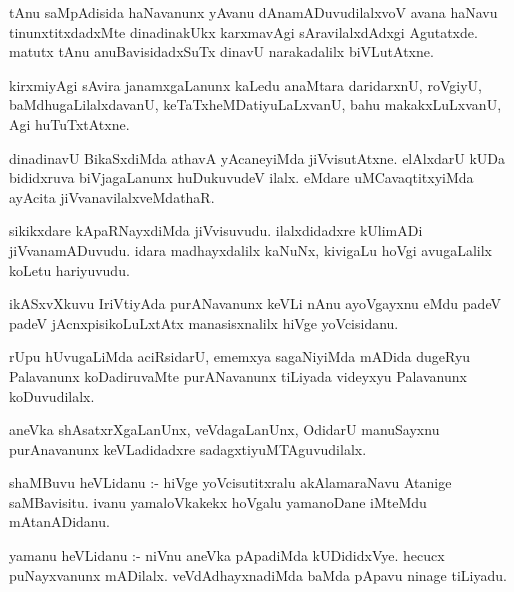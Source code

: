 \documentclass{article}
\begin{document}
\begin{mn}
tAnu  saMpAdisida  haNavanunx  yAvanu  dAnamADuvudilalxvoV  avana  haNavu  tinunxtitxdadxMte  dinadinakUkx  
karxmavAgi  sAravilalxdAdxgi  Agutatxde.  matutx  tAnu  anuBavisidadxSuTx  dinavU  narakadalilx  biVLutAtxne.
\end{mn}

\begin{mn}
kirxmiyAgi  sAvira  janamxgaLanunx  kaLedu  anaMtara  daridarxnU,  roVgiyU,  baMdhugaLilalxdavanU,  
keTaTxheMDatiyuLaLxvanU,  bahu  makakxLuLxvanU,  Agi  huTuTxtAtxne.
\end{mn}

\begin{mn}
dinadinavU  BikaSxdiMda  athavA  yAcaneyiMda  jiVvisutAtxne.  elAlxdarU  kUDa  bididxruva  
biVjagaLanunx  huDukuvudeV  ilalx.  eMdare  uMCavaqtitxyiMda  ayAcita jiVvanavilalxveMdathaR.
\end{mn}

\begin{mn}
sikikxdare  kApaRNayxdiMda  jiVvisuvudu.  ilalxdidadxre  kUlimADi  jiVvanamADuvudu.  idara  
madhayxdalilx  kaNuNx,  kivigaLu  hoVgi  avugaLalilx  koLetu  hariyuvudu.
\end{mn}

\begin{mn}
ikASxvXkuvu  IriVtiyAda  purANavanunx  keVLi  nAnu  ayoVgayxnu  eMdu  padeV padeV  jAcnxpisikoLuLxtAtx  
manasisxnalilx  hiVge  yoVcisidanu.
\end{mn}

\begin{mn}
rUpu  hUvugaLiMda  aciRsidarU,  ememxya  sagaNiyiMda  mADida  dugeRyu  Palavanunx  koDadiruvaMte  
purANavanunx  tiLiyada  videyxyu  Palavanunx  koDuvudilalx.
\end{mn}

\begin{mn}
aneVka  shAsatxrXgaLanUnx,  veVdagaLanUnx,  OdidarU  manuSayxnu  purAnavanunx  keVLadidadxre  sadagxtiyuMTAguvudilalx.
\end{mn}

\begin{mn}
shaMBuvu  heVLidanu :- hiVge  yoVcisutitxralu  akAlamaraNavu  Atanige  saMBavisitu.  ivanu  
yamaloVkakekx  hoVgalu  yamanoDane  iMteMdu  mAtanADidanu.
\end{mn}

\begin{mn}
yamanu  heVLidanu :- niVnu  aneVka  pApadiMda  kUDididxVye.  hecucx  puNayxvanunx  mADilalx.  
veVdAdhayxnadiMda  baMda  pApavu  ninage  tiLiyadu.
\end{mn}
\end{document}
